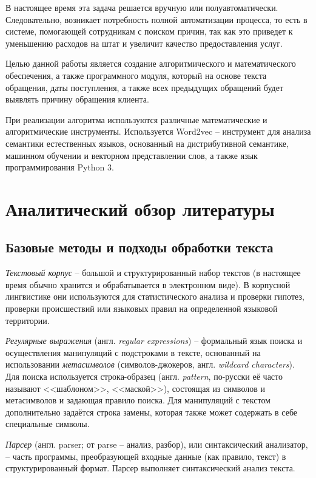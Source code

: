 \documentclass[a4paper,12pt,preview]{report} %
\begin{document}
	В настоящее время эта задача решается вручную или полуавтоматически. Следовательно, возникает потребность полной автоматизации процесса, то есть в системе, помогающей сотрудникам с поиском причин, так как это приведет к уменьшению расходов на штат и увеличит качество предоставления услуг.
	
	Целью данной работы является создание алгоритмического и математического обеспечения, а также программного модуля, который на основе текста обращения, даты поступления, а также всех предыдущих обращений будет выявлять причину обращения клиента.
	
	При реализации алгоритма используются различные математические и алгоритмические инструменты. Используется Word2vec -- инструмент для анализа семантики естественных языков, основанный на дистрибутивной семантике, машинном обучении и векторном представлении слов, а также язык программирования Python 3.
	
	\chapter{Аналитический обзор литературы}
	\section{Базовые методы и подходы обработки текста}
	
	
	\textit{Текстовый корпус} -- большой и структурированный набор текстов (в настоящее время обычно хранится и обрабатывается в электронном виде). В корпусной лингвистике они используются для статистического анализа и проверки гипотез, проверки происшествий или языковых правил на определенной языковой территории.
	
	\textit{Регулярные выражения} (англ. \textit{regular expressions}) -- формальный язык поиска и осуществления манипуляций с подстроками в тексте, основанный на использовании \textit{метасимволов} (символов-джокеров, англ. \textit{wildcard characters}). Для поиска используется строка-образец (англ. \textit{pattern}, по-русски её часто называют <<шаблоном>>, <<маской>>), состоящая из символов и метасимволов и задающая правило поиска. Для манипуляций с текстом дополнительно задаётся строка замены, которая также может содержать в себе специальные символы. \cite{1}
	
	
	\textit{Парсер} (англ. parser; от parse -- анализ, разбор), или синтаксический анализатор, -- часть программы, преобразующей входные данные (как правило, текст) в структурированный формат. Парсер выполняет синтаксический анализ текста.
	
\end{document}
